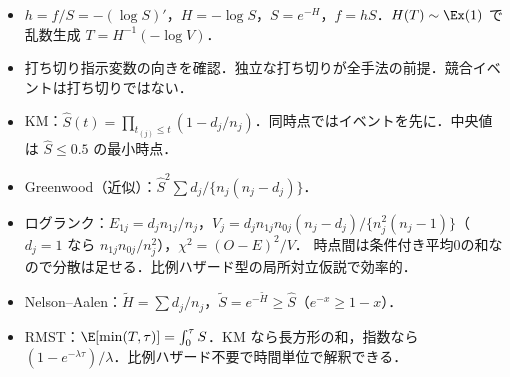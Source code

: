 \begin{summarybox}
\begin{itemize}
\item $h=f/S=-(\log S)'$，$H=-\log S$，$S=e^{-H}$，$f=hS$．$H(T)\sim\Ex(1)$ で乱数生成 $T=H^{-1}(-\log V)$．
\item 打ち切り指示変数の向きを確認．独立な打ち切りが全手法の前提．競合イベントは打ち切りではない．
\item KM：$\hat S(t)=\prod_{t_{(j)}\le t}(1-d_j/n_j)$．同時点ではイベントを先に．中央値は $\hat S\le0.5$ の最小時点．
\item Greenwood（近似）：$\hat S^2\sum d_j/\{n_j(n_j-d_j)\}$．
\item ログランク：$E_{1j}=d_jn_{1j}/n_j$，$V_j=d_jn_{1j}n_{0j}(n_j-d_j)/\{n_j^2(n_j-1)\}$（$d_j=1$ なら $n_{1j}n_{0j}/n_j^2$），$\chi^2=(O-E)^2/V$．
      時点間は条件付き平均0の和なので分散は足せる．比例ハザード型の局所対立仮説で効率的．
\item Nelson--Aalen：$\tilde H=\sum d_j/n_j$，$\tilde S=e^{-\tilde H}\ge\hat S$（$e^{-x}\ge1-x$）．
\item RMST：$\E[\min(T,\tau)]=\int_0^\tau S$．KM なら長方形の和，指数なら $(1-e^{-\lambda\tau})/\lambda$．比例ハザード不要で時間単位で解釈できる．
\end{itemize}
\end{summarybox}
